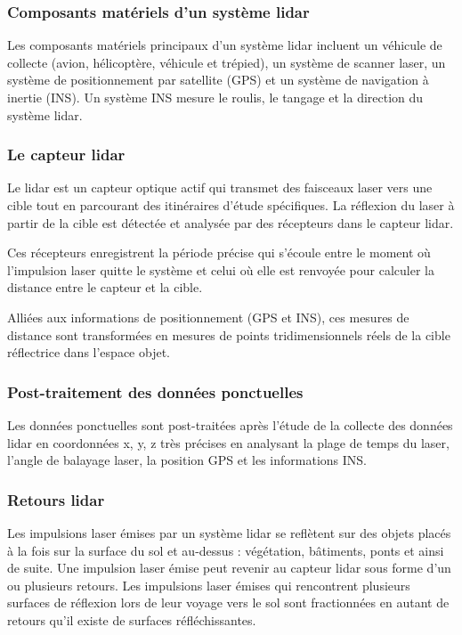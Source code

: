 \subsubsection{Composants matériels d'un système \gls{lidar}}

Les composants matériels principaux d'un système \gls{lidar} incluent un véhicule de collecte (avion, hélicoptère, véhicule et trépied), un système de scanner laser, un système de positionnement par satellite (GPS) et un système de navigation à inertie (INS). Un système INS mesure le roulis, le tangage et la direction du système \gls{lidar}.

\subsubsection{Le capteur \gls{lidar}}

Le \gls{lidar} est un capteur optique actif qui transmet des faisceaux laser vers une cible tout en parcourant des itinéraires d'étude spécifiques. La réflexion du laser à partir de la cible est détectée et analysée par des récepteurs dans le capteur \gls{lidar}.

Ces récepteurs enregistrent la période précise qui s'écoule entre le moment où l'impulsion laser quitte le système et celui où elle est renvoyée pour calculer la distance entre le capteur et la cible.

Alliées aux informations de positionnement (GPS et INS), ces mesures de distance sont transformées en mesures de points tridimensionnels réels de la cible réflectrice dans l'espace objet.

\subsubsection{Post-traitement des données ponctuelles}

Les données ponctuelles sont post-traitées après l'étude de la collecte des données \gls{lidar} en coordonnées x, y, z très précises en analysant la plage de temps du laser, l'angle de balayage laser, la position GPS et les informations INS.

\subsubsection{Retours \gls{lidar}}

Les impulsions laser émises par un système \gls{lidar} se reflètent sur des objets placés à la fois sur la surface du sol et au-dessus : végétation, bâtiments, ponts et ainsi de suite. Une impulsion laser émise peut revenir au capteur \gls{lidar} sous forme d'un ou plusieurs retours. Les impulsions laser émises qui rencontrent plusieurs surfaces de réflexion lors de leur voyage vers le sol sont fractionnées en autant de retours qu'il existe de surfaces réfléchissantes.

